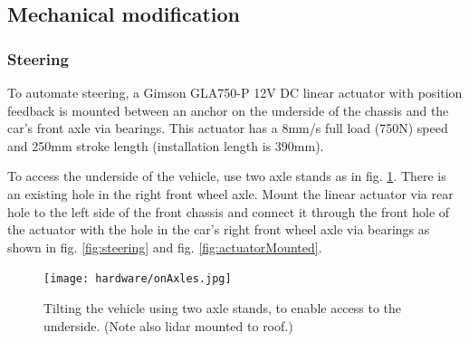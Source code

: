 \documentclass[a4paper]{article}
\begin{document}



\subsection{Mechanical modification}

\subsubsection{Steering}
To automate steering, a Gimson GLA750-P 12V DC linear actuator with position feedback is mounted between an anchor on the underside of the chassis and the car's front axle via bearings.  This actuator has a 8mm/s full load (750N) speed and 250mm stroke length (installation length is 390mm).  

To access the underside of the vehicle, use two axle stands as in fig. \ref{fig:axelStands}. There is an existing hole in the right front wheel axle.  Mount the linear actuator via rear hole to the left side of the front chassis and connect it through the front hole of the actuator with the hole in the car's right front wheel axle via bearings as shown in fig. \ref{fig:steering} and fig. \ref{fig:actuatorMounted}.

\begin{figure}[h]
	\texttt{[image: hardware/onAxles.jpg]}
	\caption{Tilting the vehicle using two axle stands, to enable access to the underside. (Note also lidar mounted to roof.)}
	\label{fig:axelStands}
\end{figure}
\end{document}
